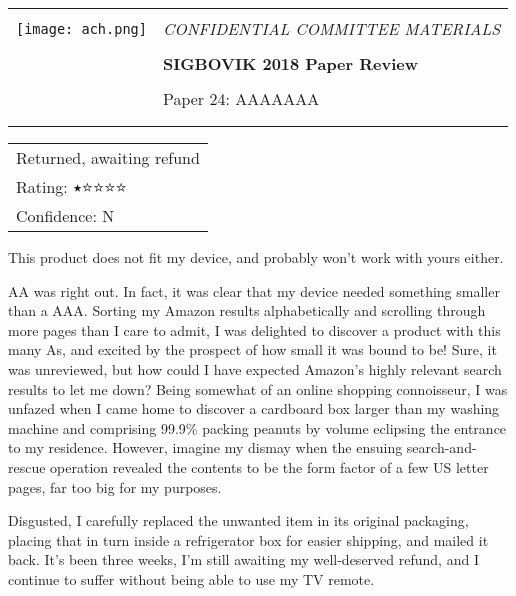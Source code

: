 \documentclass[12pt]{article}
\begin{document}
{\sffamily
\begin{tabular}{ll}
\multirow{3}{*}{\texttt{[image: ach.png]}}\\
& \Large{\em CONFIDENTIAL COMMITTEE MATERIALS} \\
&\\
& \textbf{\Huge{SIGBOVIK 2018 Paper Review}} \\
&\\
& \LARGE{Paper 24: AAAAAAA} \\[0.25em]
& \LARGE{} \\
&\\
\hline
\end{tabular}}
\vspace{2em}
\thispagestyle{empty}

{\large\bf
\begin{tabular}{l}
Returned, awaiting refund \\
Rating: $\medblackstar \medwhitestar \medwhitestar \medwhitestar \medwhitestar$ \\
Confidence: N \\
\end{tabular}}
\vspace{1em}

This product does not fit my device, and probably won't work with yours either.

AA was right out.  In fact, it was clear that my device needed something smaller than a AAA.
Sorting my Amazon results alphabetically and scrolling through more pages than I care to admit,
I was delighted to discover a product with this many As, and excited by the prospect of how small it
was bound to be!  Sure, it was unreviewed, but how could I have expected Amazon's highly relevant
search results to let me down?  Being somewhat of an online shopping connoisseur, I was unfazed when
I came home to discover a cardboard box larger than my washing machine and comprising 99.9\% packing
peanuts by volume eclipsing the entrance to my residence.  However, imagine my dismay when the
ensuing search-and-rescue operation revealed the contents to be the form factor of a few US letter
pages, far too big for my purposes.

Disgusted, I carefully replaced the unwanted item in its original packaging, placing that in turn
inside a refrigerator box for easier shipping, and mailed it back.  It's been three weeks, I'm still
awaiting my well-deserved refund, and I continue to suffer without being able to use my TV remote.
\end{document}
